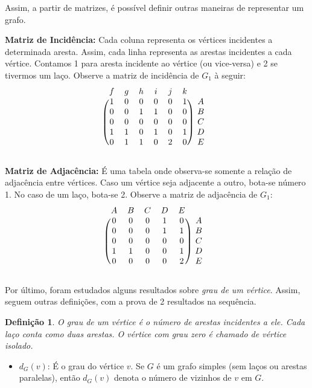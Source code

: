 \documentclass[
	12pt,				%
	openright,			%
	twoside,			%
	a4paper,			%
	english,			%
	french,				%
	spanish,			%
	brazil				%
	]{abntex2}
\newtheorem{definicao}{Definição}[section]
\begin{document}
Assim, a partir de matrizes, é possível definir outras maneiras de representar um grafo.

\noindent\textbf{Matriz de Incidência: }Cada coluna representa os vértices incidentes a determinada aresta. Assim, cada linha representa as arestas incidentes a cada vértice. Contamos 1 para aresta incidente ao vértice (ou vice-versa) e 2 se tivermos um laço. Observe a matriz de incidência de $G_1$ à seguir:
\[
\begin{blockarray}{ccccccc}
f & g & h & i & j & k \\
\begin{block}{(cccccc)c}
  1 & 0 & 0 & 0 & 0 & 1 & A \\
  0 & 0 & 1 & 1 & 0 & 0 & B \\
  0 & 0 & 0 & 0 & 0 & 0 & C \\
  1 & 1 & 0 & 1 & 0 & 1 & D \\
  0 & 1 & 1 & 0 & 2 & 0 & E \\
\end{block}
\end{blockarray}
\]

\noindent\textbf{Matriz de Adjacência: }É uma tabela onde observa-se somente a relação de adjacência entre vértices. Caso um vértice seja adjacente a outro, bota-se número 1. No caso de um laço, bota-se 2. Observe a matriz de adjacência de $G_1$:
\[
\begin{blockarray}{cccccc}
A & B & C & D & E\\
\begin{block}{(ccccc)c}
  0 & 0 & 0 & 1 & 0 & A \\
  0 & 0 & 0 & 1 & 1 & B \\
  0 & 0 & 0 & 0 & 0 & C \\
  1 & 1 & 0 & 0 & 1 & D \\
  0 & 0 & 0 & 0 & 2 & E \\
\end{block}
\end{blockarray}
\]

Por último, foram estudados alguns resultados sobre \textit{grau de um vértice}. Assim, seguem outras definições, com a prova de 2 resultados na sequência.

\begin{definicao}
O \textit{grau} de um vértice é o número de arestas incidentes a ele. Cada laço conta como duas arestas. O vértice com \textit{grau} zero é chamado de \textit{vértice isolado}.
\end{definicao}
\begin{itemize}
\item $d_{G}(v)$: É o grau do vértice $v$. Se $G$ é um grafo simples (sem laços ou arestas paralelas), então $d_{G}(v)$ denota o número de vizinhos de $v$ em $G$.
\end{itemize}
\end{document}
